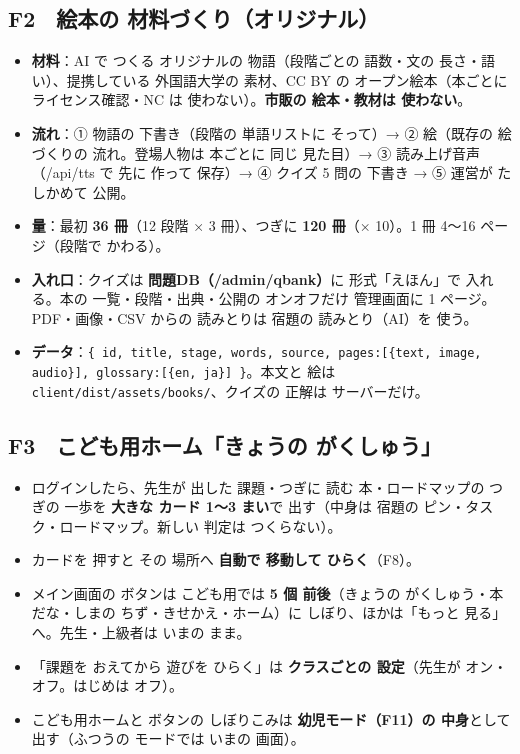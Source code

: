 \documentclass[a4paper,10pt]{article}
\begin{document}
\subsection{F2　絵本の 材料づくり（オリジナル）}
\begin{itemize}
\item \textbf{材料}：AI で つくる オリジナルの 物語（段階ごとの 語数・文の 長さ・語い）、提携している 外国語大学の 素材、CC BY の オープン絵本（本ごとに ライセンス確認・NC は 使わない）。\textbf{市販の 絵本・教材は 使わない}。
\item \textbf{流れ}：① 物語の 下書き（段階の 単語リストに そって）→ ② 絵（既存の 絵づくりの 流れ。登場人物は 本ごとに 同じ 見た目）→ ③ 読み上げ音声（/api/tts で 先に 作って 保存）→ ④ クイズ 5 問の 下書き → ⑤ 運営が たしかめて 公開。
\item \textbf{量}：最初 \textbf{36 冊}（12 段階 × 3 冊）、つぎに \textbf{120 冊}（× 10）。1 冊 4〜16 ページ（段階で かわる）。
\item \textbf{入れ口}：クイズは \textbf{問題DB（/admin/qbank）}に 形式「えほん」で 入れる。本の 一覧・段階・出典・公開の オンオフだけ 管理画面に 1 ページ。PDF・画像・CSV からの 読みとりは 宿題の 読みとり（AI）を 使う。
\item \textbf{データ}：\texttt{\{ id, title, stage, words, source, pages:[\{text, image, audio\}], glossary:[\{en, ja\}] \}}。本文と 絵は \texttt{client/dist/assets/books/}、クイズの 正解は サーバーだけ。
\end{itemize}

\subsection{F3　こども用ホーム「きょうの がくしゅう」}
\begin{itemize}
\item ログインしたら、先生が 出した 課題・つぎに 読む 本・ロードマップの つぎの 一歩を \textbf{大きな カード 1〜3 まい}で 出す（中身は 宿題の ピン・タスク・ロードマップ。新しい 判定は つくらない）。
\item カードを 押すと その 場所へ \textbf{自動で 移動して ひらく}（F8）。
\item メイン画面の ボタンは こども用では \textbf{5 個 前後}（きょうの がくしゅう・本だな・しまの ちず・きせかえ・ホーム）に しぼり、ほかは「もっと 見る」へ。先生・上級者は いまの まま。
\item 「課題を おえてから 遊びを ひらく」は \textbf{クラスごとの 設定}（先生が オン・オフ。はじめは オフ）。
\item こども用ホームと ボタンの しぼりこみは \textbf{幼児モード（F11）の 中身}として 出す（ふつうの モードでは いまの 画面）。
\end{itemize}
\end{document}
